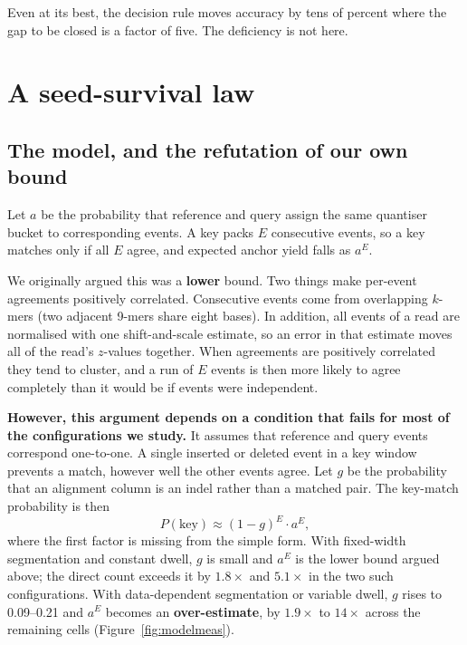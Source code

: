 \documentclass[conference]{IEEEtran}
\begin{document}
Even at its best, the decision rule moves accuracy by tens of percent where the gap to be closed
is a factor of five. The deficiency is not here.

\section{A seed-survival law}
\label{sec:law}

\subsection{The model, and the refutation of our own bound}

Let $a$ be the probability that reference and query assign the same quantiser bucket to
corresponding events. A key packs $E$ consecutive events, so a key matches only if all $E$
agree, and expected anchor yield falls as $a^{E}$.

We originally argued this was a \textbf{lower} bound. Two things make per-event agreements
positively correlated. Consecutive events come from overlapping $k$-mers (two adjacent 9-mers
share eight bases). In addition, all events of a read are normalised with one shift-and-scale
estimate, so an error in that estimate moves all of the read's $z$-values together. When
agreements are positively correlated they tend to cluster, and a run of $E$ events is then more
likely to agree completely than it would be if events were independent.

\textbf{However, this argument depends on a condition that fails for most of the configurations
we study.} It assumes that reference and query events correspond one-to-one. A single inserted
or deleted event in a key window prevents a match, however well the other events agree. Let $g$
be the probability that an alignment column is an indel rather than a matched pair. The
key-match probability is then
\begin{equation}
P(\mathrm{key}) \approx (1-g)^{E} \cdot a^{E},
\label{eq:pkey}
\end{equation}
where the first factor is missing from the simple form. With fixed-width segmentation and
constant dwell, $g$ is small and $a^{E}$ is the lower bound argued above; the direct count
exceeds it by $1.8\times$ and $5.1\times$ in the two such configurations. With data-dependent
segmentation or variable dwell, $g$ rises to 0.09--0.21 and $a^{E}$ becomes an
\textbf{over-estimate}, by $1.9\times$ to $14\times$ across the remaining cells
(Figure~\ref{fig:modelmeas}).
\end{document}
